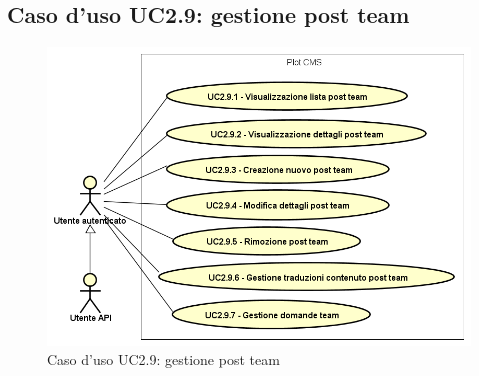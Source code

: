 \subsection{Caso d'uso UC2.9: gestione post team}

        \begin{figure}[H]
            \centering
            \includegraphics[scale=0.95, width=\textwidth]{immagini/usecase/UC2-9.png}
            \caption{Caso d'uso UC2.9: gestione post team}\label{fig:UC2.9} 
        \end{figure}
